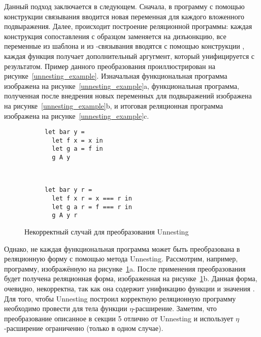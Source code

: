 
Данный подход заключается в следующем. Сначала, в программу с помощью конструкции связывания  вводится новая переменная для каждого вложенного подвыражения. Далее, происходит построение реляционной программы: каждая конструкция сопоставления с образцом заменяется на дизъюнкцию, все переменные из шаблона и из -связывания вводятся с помощью конструкции , каждая функция получает дополнительный аргугмент, который унифицируется с результатом. Пример данного преобразования проиллюстрирован на рисунке~\ref{unnesting_example}. Изначальная функциональная программа изображена на рисунке~\ref{unnesting_example}a, функциональная программа, полученная после внедрения новых переменных для подвыражений изображена на рисунке~\ref{unnesting_example}b, и итоговая реляционная программа изображена на рисунке~\ref{unnesting_example}c.

\begin{figure}[h]
\centering
\begin{subfigure}[t]{0.4\textwidth}
 \centering
\begin{lstlisting}
let bar y =
  let f x = x in
  let g a = f in
  g A y
\end{lstlisting}
\vspace{-1\baselineskip}
    \caption{}
  \end{subfigure}
  ~
  \begin{subfigure}[t]{0.4\textwidth}
    \centering
\begin{lstlisting}
let bar y r =
  let f x r = x === r in
  let g a r = f === r in
  g A y r
\end{lstlisting}
\vspace{-1\baselineskip}
  \caption{}
  \end{subfigure}
\caption{Некорректный случай для преобразования Unnesting}
\label{unnesting_invalid}
\end{figure}


Однако, не каждая функциональная программа может быть преобразована в реляционную форму с помощью метода Unnesting. Рассмотрим, например, программу, изображённую на рисунке~\ref{unnesting_invalid}a. После применения преобразования будет получена реляционная форма, изображенная на рисунке~\ref{unnesting_invalid}b. Данная форма, очевидно, некорректна, так как она содержит унификацию функции  и значения . Для того, чтобы Unnesting построил корректную реляционную программу необходимо провести для тела функции  $\eta$-расширение. Заметим, что преобразование описанное в секции 5 отлично от Unnesting и использует $\eta$-расширение ограниченно (только в одном случае).


